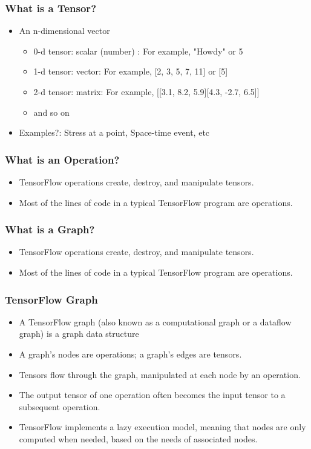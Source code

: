 \begin{frame}[fragile] \frametitle{What is a Tensor?}
\begin{itemize}
\item An n-dimensional vector
\begin{itemize}
\item 0-d tensor: scalar (number) : For example, "Howdy" or 5
\item 1-d tensor: vector:  For example, [2, 3, 5, 7, 11] or [5]
\item 2-d tensor: matrix: For example, [[3.1, 8.2, 5.9][4.3, -2.7, 6.5]]
\item and so on
\end{itemize}
\item Examples?: Stress at a point, Space-time event, etc
\end{itemize}
\end{frame}

\begin{frame}[fragile] \frametitle{What is an  Operation?}
\begin{itemize}
\item TensorFlow operations create, destroy, and manipulate tensors. 
\item Most of the lines of code in a typical TensorFlow program are operations.
\end{itemize}
\end{frame}

\begin{frame}[fragile] \frametitle{What is a Graph?}
\begin{itemize}
\item TensorFlow operations create, destroy, and manipulate tensors. 
\item Most of the lines of code in a typical TensorFlow program are operations.
\end{itemize}
\end{frame}

\begin{frame}[fragile] \frametitle{TensorFlow Graph}
\begin{itemize}
\item A TensorFlow graph (also known as a computational graph or a dataflow graph) is a graph data structure
\item A graph's nodes are operations; a graph's edges are tensors. 
\item Tensors flow through the graph, manipulated at each node by an operation. 
\item The output tensor of one operation often becomes the input tensor to a subsequent operation. 
\item TensorFlow implements a lazy execution model, meaning that nodes are only computed when needed, based on the needs of associated nodes.
\end{itemize}
\end{frame}


